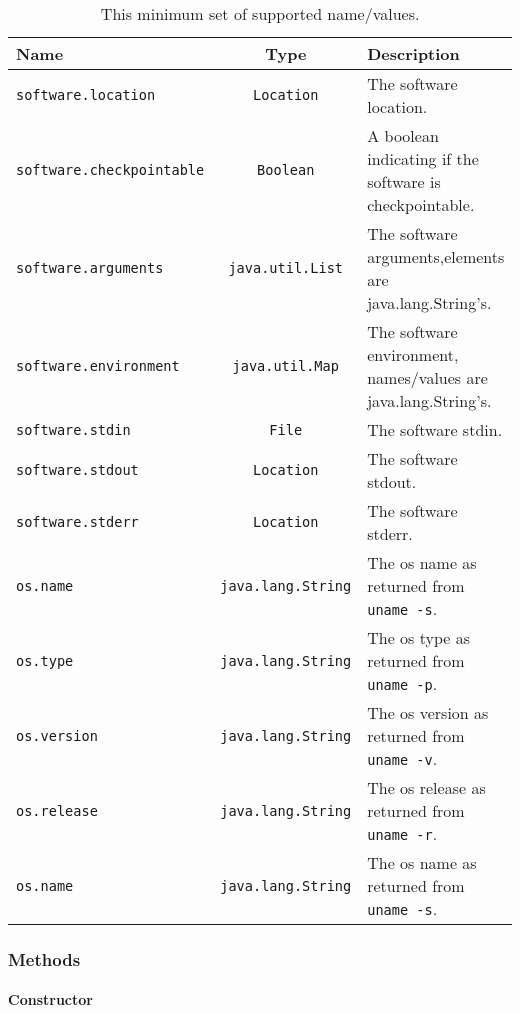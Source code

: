 \documentclass[$Date: 2003/06/26 19:29:31 $]{glabarticle}
\begin{document}
\begin{table}[htp]
\begin{center}
\begin{tabular}{|l|c|l|} \hline
Name & Type & Description \\ \hline\hline
\verb"software.location" & \verb"Location" & The software location. \\ \hline
\verb"software.checkpointable" & \verb"Boolean" & A boolean indicating if the software is checkpointable. \\ \hline
\verb"software.arguments" & \verb"java.util.List" & The software arguments,elements are java.lang.String's. \\ \hline
\verb"software.environment" & \verb"java.util.Map" & The software environment, names/values are java.lang.String's. \\ \hline
\verb"software.stdin" & \verb"File" & The software stdin. \\ \hline
\verb"software.stdout" & \verb"Location" & The software stdout. \\ \hline
\verb"software.stderr" & \verb"Location" & The software stderr. \\ \hline
\verb"os.name" & \verb"java.lang.String" & The os name  as returned from \texttt{uname -s}. \\ \hline
\verb"os.type" & \verb"java.lang.String" & The os type  as returned from \texttt{uname -p}. \\ \hline
\verb"os.version" & \verb"java.lang.String" & The os version  as returned from \texttt{uname -v}. \\ \hline
\verb"os.release" & \verb"java.lang.String" & The os release  as returned from \texttt{uname -r}. \\ \hline
\verb"os.name" & \verb"java.lang.String" & The os name  as returned from \texttt{uname -s}. \\ \hline
\end{tabular}
\end{center}
\caption{This minimum set of supported name/values.}
\label{table:SRD}
\end{table}


\subsubsection{Methods}

\paragraph{Constructor}
\end{document}
